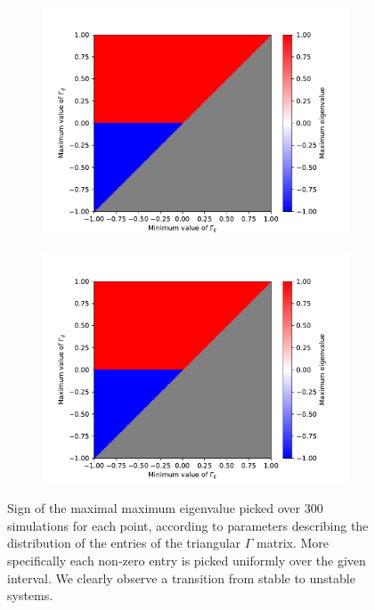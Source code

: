 \documentclass[12pt, titlepage]{report}
\begin{document}
		\begin{figure}
			\centering
			\begin{subfigure}{0.49\textwidth}
				\includegraphics[width=\linewidth]{max_maximum_eigval_wrto_Gamma_NR=3.pdf}
			\end{subfigure}
			\hfill
			\begin{subfigure}{0.49\textwidth}
				\includegraphics[width=\linewidth]{max_maximum_eigval_wrto_Gamma_NR=8.pdf}
			\end{subfigure}
			\caption{Sign of the maximal maximum eigenvalue picked over 300 simulations for each point, according to parameters describing the distribution of the entries of the triangular $\Gamma$ matrix. More specifically each non-zero entry is picked uniformly over the given interval. We clearly observe a transition from stable to unstable systems.} \label{fig : max max eigenvalue}
		\end{figure}
\end{document}
